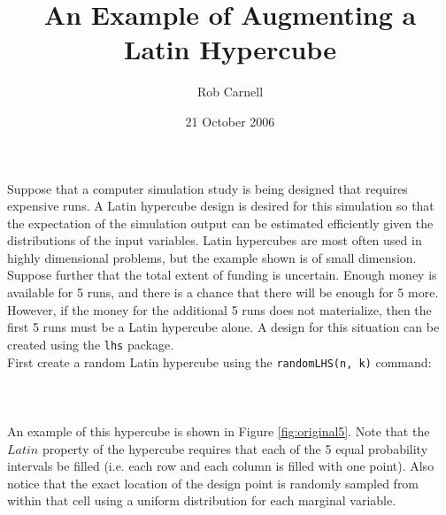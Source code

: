\documentclass[12pt]{article}
\begin{document}
\title{An Example of Augmenting a Latin Hypercube}
\author{Rob Carnell}
\date{21 October 2006}
\maketitle

Suppose that a computer simulation study is being designed that requires expensive runs.  A Latin hypercube design is desired for this simulation so that the expectation of the simulation output can be estimated efficiently given the distributions of the input variables.  Latin hypercubes are most often used in highly dimensional problems, but the example shown is of small dimension.  Suppose further that the total extent of funding is uncertain.  Enough money is available for 5 runs, and there is a chance that there will be enough for 5 more.  However, if the money for the additional 5 runs does not materialize, then the first 5 runs must be a Latin hypercube alone.  A design for this situation can be created using the \texttt{lhs} package.\\

First create a random Latin hypercube using the \texttt{randomLHS(n, k)} command:\\
\\
\indent{}\\
\\
An example of this hypercube is shown in Figure \ref{fig:original5}.  Note that the $Latin$ property of the hypercube requires that each of the 5 equal probability intervals be filled (i.e. each row and each column is filled with one point).  Also notice that the exact location of the design point is randomly sampled from within that cell using a uniform distribution for each marginal variable.\\
\end{document}
